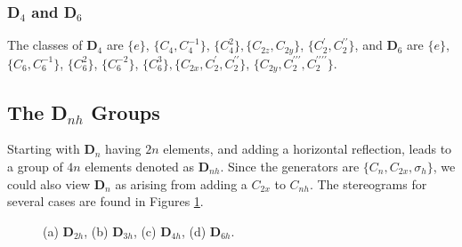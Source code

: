 \subsubsection{D$_4$ and D$_6$}

The classes of {\bf D}$_4$ are $\{e\}$, $\{C_4 , C_4^{-1}\}$, 
$\{C^2_4\}, \{C_{2z}, C_{2y}\}$, $\{C^{\prime}_2 , 
C^{\prime \prime}_2\}$, and {\bf D}$_6$ are $\{e\}$, $\{C_6 , 
C_6^{-1}\}$, $\{C_6^2\}$, $\{C_6^{-2}\}$, $\{C_6^3\}, \{C_{2x} , 
C^{\prime}_2 , C_2^{\prime \prime}\}$, $\{C_{2y}, C_2^{\prime \prime 
\prime} , C_2^{\prime \prime \prime \prime}\}$.

\subsection{The D$_{nh}$ Groups}

Starting with {\bf D}$_n$ having $2n$ elements, and adding a
horizontal reflection, leads to a group of $4n$ elements denoted as
{\bf D}$_{nh}$.  Since the generators are $\{C_n , C_{2x},
\sigma_h\}$, we could also view {\bf D}$_n$ as arising from adding a
$C_{2x}$ to $C_{nh}$.  The stereograms for several cases are found in
Figures \ref{chap16-fig23}.

\begin{figure}
\caption{(a) {\bf D}$_{2h}$, (b) {\bf D}$_{3h}$, (c) {\bf D}$_{4h}$,
(d) {\bf D}$_{6h}$.}
\label{chap16-fig23}
\end{figure}

